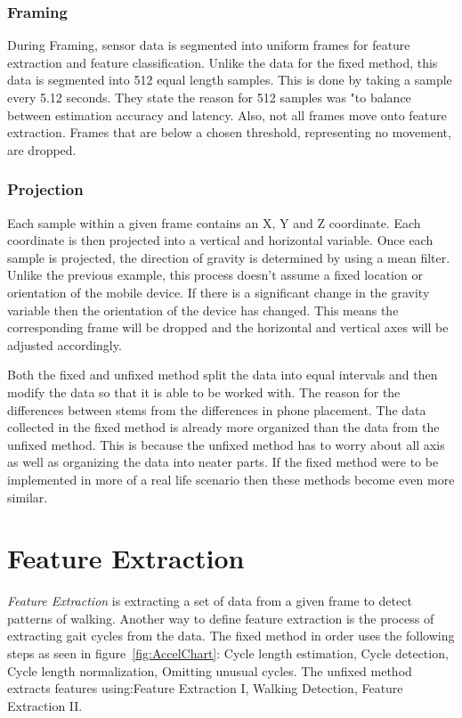 \documentclass{sig-alternate}
\begin{document}
\subsubsection{Framing}{
 During Framing, sensor data is segmented into uniform frames for feature extraction and feature classification. Unlike the data for the fixed method, this data is segmented into 512 equal length samples. This is done by taking a sample every 5.12 seconds. They state the reason for 512 samples was "to balance between estimation accuracy and latency. Also, not all frames move onto feature extraction. Frames that are below a chosen threshold, representing no movement, are dropped. 
 }
\subsubsection{Projection}{
Each sample within a given frame contains an X, Y and Z coordinate. Each coordinate is then projected into a vertical and horizontal variable. Once each sample is projected, the direction of gravity is determined by using a mean filter. Unlike the previous example, this process doesn't assume a fixed location or orientation of the mobile device. If there is a significant change in the gravity variable then the orientation of the device has changed. This means the corresponding frame will be dropped and the horizontal and vertical axes will be adjusted accordingly. 
}

Both the fixed and unfixed method split the data into equal intervals and then modify the data so that it is able to be worked with. The reason for the differences between stems from the differences in phone placement. The data collected in the fixed method is already more organized than the data from the unfixed method. This is because the unfixed method has to worry about all axis as well as organizing the data into neater parts. If the fixed method were to be implemented in more of a real life scenario then these methods become even more similar. 

\section{Feature Extraction}
	\textit{Feature Extraction} is extracting a set of data from a given frame to detect patterns of walking. Another way to define feature extraction is the process of extracting gait cycles from the data. The fixed method in order uses the following steps as seen in figure~\ref{fig:AccelChart}: Cycle length estimation, Cycle detection, Cycle length normalization, Omitting unusual cycles. The unfixed method extracts features using:Feature Extraction I, Walking Detection, Feature Extraction II.  
\end{document}
